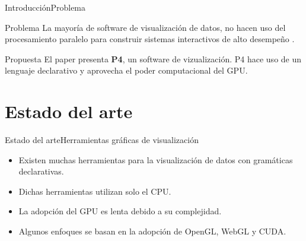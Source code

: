 \documentclass[10pt]{beamer}
\newcommand{\1}{
        	\setbeamertemplate{background}{
        		\texttt{[image: img/1]}
        		\tikz[overlay] \fill[fill opacity=0.75,fill=white] (0,0) rectangle (-\paperwidth,\paperheight);
        	}
}
\begin{document}
\begin{frame}{Introducción}{Problema}	
	\begin{block}{Problema}
		La mayoría de software de visualización de datos, no hacen uso del procesamiento paralelo para construir sistemas interactivos de alto desempeño \cite{li2018p4}.		
	\end{block}
	\pause
	\begin{block}{Propuesta}
		El paper presenta \textbf{P4}, un software de vizualización. P4 hace uso de un lenguaje declarativo y aprovecha el poder computacional del GPU.		
	\end{block}	
\end{frame}

\section{Estado del arte}

\begin{frame}{Estado del arte}{Herramientas gráficas de visualización}	
		\begin{itemize}
			\item Existen muchas herramientas para la visualización de datos con gramáticas declarativas. \pause
			\item Dichas herramientas utilizan solo el CPU. \pause
			\item La adopción del GPU es lenta debido a su complejidad. \pause
			\item Algunos enfoques se basan en la adopción de OpenGL, WebGL y CUDA.
		\end{itemize}
\end{frame}
\end{document}
